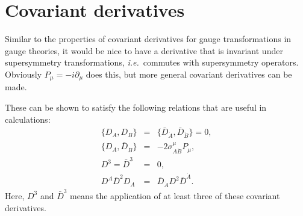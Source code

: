 \documentclass[notes.tex]{subfiles}
\begin{document}
\section{Covariant derivatives}
\label{sec:covder}
Similar to the properties of covariant derivatives for gauge transformations in gauge theories, it would be nice to have a derivative that is invariant under supersymmetry transformations, {\it i.e.}\ commutes with supersymmetry operators. Obviously $P_\mu = -i\partial_\mu$ does this, but more general covariant derivatives can be made.

These can be shown to satisfy the following relations that are useful in calculations:
\begin{eqnarray}
\{D_A, D_B\} &=& \{\bar{D}_{\dot{A}}, \bar{D}_{\dot{B}}\} = 0,\\
\{D_A, \bar{D}_{\dot{B}}\} &=& -2\sigma^\mu_{A\dot{B}}P_\mu, \label{eq:D2}\\
D^3 = \bar{D}^3&=&0 \label{eq:D3}, \\
D^A\bar{D}^2 D_A &=& \bar{D}_{\dot{A}}D^2\bar{D}^{\dot{A}}.
\end{eqnarray}
Here, $D^3$ and $\bar D^3$ means the application of at least three of these covariant derivatives.

\end{document}
